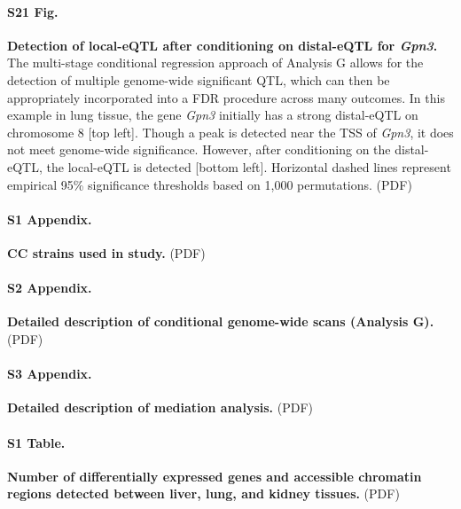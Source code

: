 \documentclass[10pt,letterpaper]{article}
\begin{document}
\paragraph*{S21 Fig.}
\label{S_conditional_scan}
{\bf Detection of local-eQTL after conditioning on distal-eQTL for \textit{Gpn3}.} 
The multi-stage conditional regression approach of Analysis G allows for the detection of multiple genome-wide significant QTL, which can then be appropriately incorporated into a FDR procedure across many outcomes. In this example in lung tissue, the gene \textit{Gpn3} initially has a strong distal-eQTL on chromosome 8 [top left]. Though a peak is detected near the TSS of \textit{Gpn3}, it does not meet genome-wide significance. However, after conditioning on the distal-eQTL, the local-eQTL is detected [bottom left]. Horizontal dashed lines represent empirical 95\% significance thresholds based on 1,000 permutations. (PDF)



\paragraph*{S1 Appendix.}
\label{S1_Appendix}
{\bf CC strains used in study.} 
(PDF)

\paragraph*{S2 Appendix.}
\label{S2_Appendix}
{\bf Detailed description of conditional genome-wide scans (Analysis G).}
(PDF)

\paragraph*{S3 Appendix.}
\label{S3_Appendix}
{\bf Detailed description of mediation analysis.}
(PDF)

\paragraph*{S1 Table.}
\label{S_de}
{\bf Number of differentially expressed genes and accessible chromatin regions detected between liver, lung, and kidney tissues.} 
(PDF)
\end{document}

